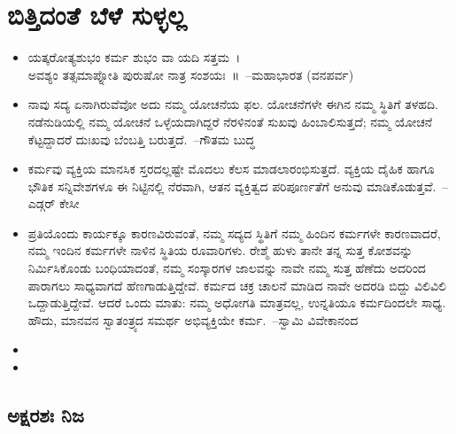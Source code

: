 
\chapter{ಬಿತ್ತಿದಂತೆ ಬೆಳೆ ಸುಳ್ಳಲ್ಲ}

\indentsecionsintoc

\begin{itemize}
\item ಯತ್ಕರೋತ್ಯಶುಭಂ ಕರ್ಮ ಶುಭಂ ವಾ ಯದಿ ಸತ್ತಮ~।\\ಅವಶ್ಯಂ ತತ್ಸಮಾಪ್ನೋತಿ ಪುರುಷೋ ನಾತ್ರ ಸಂಶಯಃ~॥~\hfill–ಮಹಾಭಾರತ (ವನಪರ್ವ)

 \item ನಾವು ಸದ್ಯ ಏನಾಗಿರುವೆವೋ ಅದು ನಮ್ಮ ಯೋಚನೆಯ ಫಲ. ಯೋಚನೆಗಳೇ ಈಗಿನ ನಮ್ಮ ಸ್ಥಿತಿಗೆ ತಳಹದಿ. ನಡೆನುಡಿಯಲ್ಲಿ ನಮ್ಮ ಯೋಚನೆ ಒಳ್ಳೆಯದಾಗಿದ್ದರೆ ನೆರಳಿನಂತೆ ಸುಖವು ಹಿಂಬಾಲಿಸುತ್ತದೆ; ನಮ್ಮ ಯೋಚನೆ ಕೆಟ್ಟದ್ದಾದರೆ ದುಃಖವು ಬೆಂಬತ್ತಿ ಬರುತ್ತದೆ.~\hfill–ಗೌತಮ ಬುದ್ಧ

 \item ಕರ್ಮವು ವ್ಯಕ್ತಿಯ ಮಾನಸಿಕ ಸ್ತರದಲ್ಲಷ್ಟೇ ಮೊದಲು ಕೆಲಸ ಮಾಡಲಾರಂಭಿಸುತ್ತದೆ. ವ್ಯಕ್ತಿಯ ದೈಹಿಕ ಹಾಗೂ ಭೌತಿಕ ಸನ್ನಿವೇಶಗಳೂ ಈ ನಿಟ್ಟಿನಲ್ಲಿ ನೆರವಾಗಿ, ಆತನ ವ್ಯಕ್ತಿತ್ವದ ಪರಿಪೂರ್ಣತೆಗೆ ಅನುವು ಮಾಡಿಕೊಡುತ್ತವೆ.~\hfill–ಎಡ್ಗರ್ ಕೇಸೀ

 \item ಪ್ರತಿಯೊಂದು ಕಾರ್ಯಕ್ಕೂ ಕಾರಣವಿರುವಂತೆ, ನಮ್ಮ ಸದ್ಯದ ಸ್ಥಿತಿಗೆ ನಮ್ಮ ಹಿಂದಿನ ಕರ್ಮಗಳೇ ಕಾರಣವಾದರೆ, ನಮ್ಮ ಇಂದಿನ ಕರ್ಮಗಳೇ ನಾಳಿನ ಸ್ಥಿತಿಯ ರೂವಾರಿಗಳು. ರೇಶ್ಮೆ ಹುಳು ತಾನೇ ತನ್ನ ಸುತ್ತ ಕೋಶವನ್ನು ನಿರ್ಮಿಸಿಕೊಂಡು ಬಂಧಿಯಾದಂತೆ, ನಮ್ಮ ಸಂಸ್ಕಾರಗಳ ಜಾಲವನ್ನು ನಾವೇ ನಮ್ಮ ಸುತ್ತ ಹೆಣೆದು ಅದರಿಂದ ಪಾರಾಗಲು ಸಾಧ್ಯವಾಗದೆ ಹೆಣಗಾಡುತ್ತಿದ್ದೇವೆ. ಕರ್ಮದ ಚಕ್ರ ಚಾಲನೆ ಮಾಡಿದ ನಾವೇ ಅದರಡಿ ಬಿದ್ದು ವಿಲಿವಿಲಿ ಒದ್ದಾಡುತ್ತಿದ್ದೇವೆ. ಆದರೆ ಒಂದು ಮಾತು: ನಮ್ಮ ಅಧೋಗತಿ ಮಾತ್ರವಲ್ಲ, ಉನ್ನತಿಯೂ ಕರ್ಮದಿಂದಲೇ ಸಾಧ್ಯ. ಹೌದು, ಮಾನವನ ಸ್ವಾತಂತ್ರ್ಯದ ಸಮರ್ಥ ಅಭಿವ್ಯಕ್ತಿಯೇ ಕರ್ಮ.~\hfill–ಸ್ವಾಮಿ ವಿವೇಕಾನಂದ

 \item {}

 \item {}

\end{itemize}


\section*{ಅಕ್ಷರಶಃ ನಿಜ}

